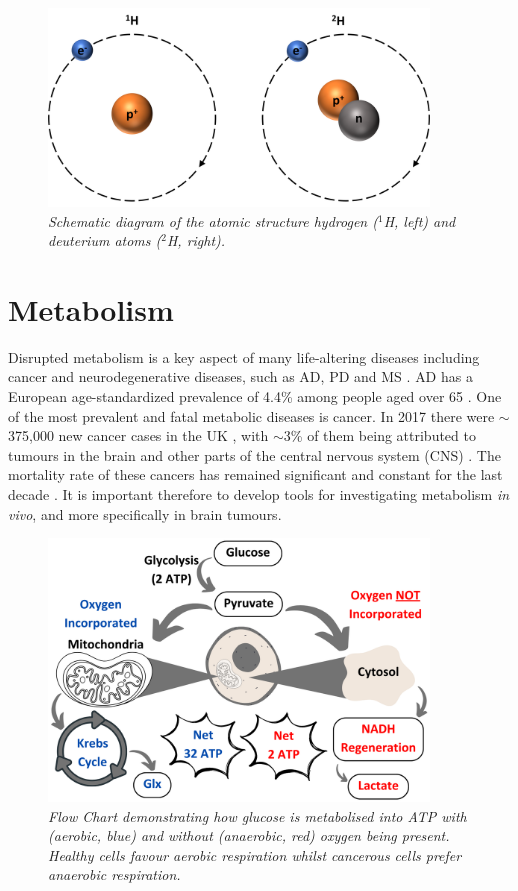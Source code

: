 \begin{figure}
    \centering
    \includegraphics[width=0.9\textwidth]{Figures/Intro/1H2H.png}
    \caption{\textit{Schematic diagram of the atomic structure hydrogen ($^1$H, left) and deuterium atoms ($^2$H, right).}}
    \label{fig:intro:1H2H}
\end{figure}

\section{Metabolism}

Disrupted metabolism is a key aspect of many life-altering diseases including cancer and neurodegenerative diseases, such as \ac{AD}, \ac{PD} and \ac{MS} \cite{Gialleonardo2016TheImaging}. \ac{AD} has a European age-standardized prevalence of 4.4\% among people aged over 65 \cite{Qiu2009EpidemiologyIntervention}. One of the most prevalent and fatal metabolic diseases is cancer. In 2017 there were $\sim$375,000 new cancer cases in the UK \cite{CancerUK}, with $\sim$3\% of them being attributed to tumours in the brain and other parts of the central nervous system (CNS) \cite{BrainUK}. The mortality rate of these cancers has remained significant and constant for the last decade \cite{BrainUK}. It is important therefore to develop tools for investigating metabolism \textit{in vivo}, and more specifically in brain tumours.

\begin{figure}
    \centering
    \includegraphics[width=0.9\textwidth]{Figures/Intro/Metabolism.png}
    \caption{\textit{Flow Chart demonstrating how glucose is metabolised into \ac{ATP} with (aerobic, blue) and without (anaerobic, red) oxygen being present. Healthy cells favour aerobic respiration whilst cancerous cells prefer anaerobic respiration.}}
    \label{fig:intro:Metabolism}
\end{figure}

